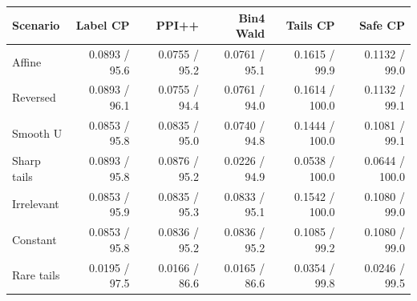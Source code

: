 \begin{tabular}{lrrrrr}
\toprule
Scenario & Label CP & PPI++ & Bin4 Wald & Tails CP & Safe CP \\
\midrule
Affine & 0.0893 / 95.6 & 0.0755 / 95.2 & 0.0761 / 95.1 & 0.1615 / 99.9 & 0.1132 / 99.0 \\
Reversed & 0.0893 / 96.1 & 0.0755 / 94.4 & 0.0761 / 94.0 & 0.1614 / 100.0 & 0.1132 / 99.1 \\
Smooth U & 0.0853 / 95.8 & 0.0835 / 95.0 & 0.0740 / 94.8 & 0.1444 / 100.0 & 0.1081 / 99.1 \\
Sharp tails & 0.0893 / 95.8 & 0.0876 / 95.2 & 0.0226 / 94.9 & 0.0538 / 100.0 & 0.0644 / 100.0 \\
Irrelevant & 0.0853 / 95.9 & 0.0835 / 95.3 & 0.0833 / 95.1 & 0.1542 / 100.0 & 0.1080 / 99.0 \\
Constant & 0.0853 / 95.8 & 0.0836 / 95.2 & 0.0836 / 95.2 & 0.1085 / 99.2 & 0.1080 / 99.0 \\
Rare tails & 0.0195 / 97.5 & 0.0166 / 86.6 & 0.0165 / 86.6 & 0.0354 / 99.8 & 0.0246 / 99.5 \\
\bottomrule
\end{tabular}